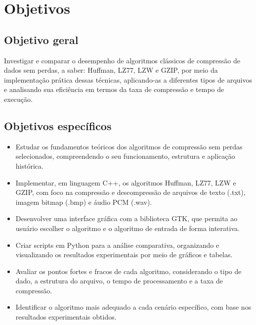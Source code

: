 \section{Objetivos}
\subsection{Objetivo geral}
Investigar e comparar o desempenho de algoritmos clássicos de compressão de dados sem perdas, a saber: Huffman, LZ77, LZW e GZIP, por meio da implementação prática dessas técnicas, 
aplicando-as a diferentes tipos de arquivos e analisando sua eficiência em termos da taxa de compressão e tempo de execução.
\subsection{Objetivos específicos}
	\begin{itemize}
		\item{Estudar os fundamentos teóricos dos algoritmos de compressão sem perdas selecionados, compreendendo o seu funcionamento, estrutura e aplicação histórica.}
		\item{Implementar, em linguagem C++, os algoritmos Huffman, LZ77, LZW e GZIP, com foco na compressão e descompressão de arquivos de texto (.txt), imagem bitmap (.bmp) e áudio PCM (.wav).}
		\item{Desenvolver uma interface gráfica com a biblioteca GTK, que permita ao usuário escolher o algoritmo e o algoritmo de entrada de forma interativa.}
		\item{Criar scripts em Python para a análise comparativa, organizando e visualizando os resultados experimentais por meio de gráficos e tabelas.}
		\item{Avaliar os pontos fortes e fracos de cada algoritmo, considerando o tipo de dado, a estrutura do arquivo, o tempo de processamento e a taxa de compressão.}
		\item{Identificar o algoritmo mais adequado a cada cenário específico, com base nos resultados experimentais obtidos.}
	\end{itemize}
